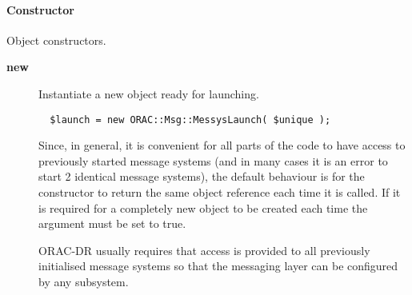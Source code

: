 \paragraph*{Constructor\label{ORAC::Msg::MessysLaunch_Constructor}}

Object constructors.

\begin{description}
\item[\textbf{new}] \mbox{}

Instantiate a new object ready for launching.

\begin{verbatim}
  $launch = new ORAC::Msg::MessysLaunch( $unique );
\end{verbatim}


Since, in general, it is convenient for all parts of the code to have
access to previously started message systems (and in many cases it is
an error to start 2 identical message systems), the default behaviour
is for the constructor to return the same object reference each time
it is called. If it is required for a completely new object to be
created each time the argument must be set to true.



ORAC-DR usually requires that access is provided to all previously
initialised message systems so that the messaging layer can be
configured by any subsystem.

\end{description}
